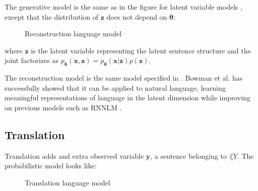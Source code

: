 The generative model is the same as in the figure for latent variable models
, except that the distribution of $\bm{z}$ does not depend on $\bm{\theta}$:
\begin{figure}[H]
  \center
  \label{tikz:reconstruction_model}
  \caption{Reconstruction language model}
\end{figure}
where $\bm{z}$ is the latent variable representing the latent sentence structure
and the joint factorizes as $p_{\bm{\theta}}(\bm{x}, \bm{z}) =
p_{\bm{\theta}}(\bm{x} | \bm{z})p(\bm{z})$.

The reconstruction model is the same model specified in
\cite{kingma_auto-encoding_2013}. Bowman et al. has successfully showed that it
can be applied to natural language, learning meaningful representations of
language in the latent dimension \cite{bowman_generating_2015} while improving
on previous models such as RNNLM \cite{conf/icassp/MikolovKBCK11}.

\subsection{Translation}

Translation adds and extra observed variable $\bm{y}$, a sentence belonging to
$\lang{Y}$. The probabilistic model looks like:

\begin{figure}[H]
  \center
  \caption{Translation language model}
\end{figure}

